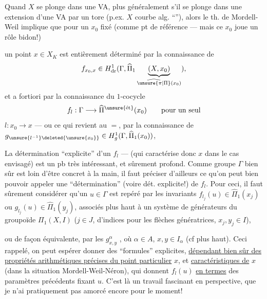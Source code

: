 
Quand $X$ se plonge dans une VA, plus généralement s'il se plonge dans une extension d'une VA par un tore (p.ex. $X$ courbe alg. ``''), alors le th. de Mordell-Weil implique que pour un $x_0$  fixé (comme pt de référence --- mais ce $x_0$  joue un rôle bidon!)

un point $x\in X_K$ est entièrement déterminé par la connaissance de 
\[
f_{x_0,x}\in H^1_{\mathrm{dr}}(\Gamma,\widehat\Pi_1\underbrace{(X,x_0)}_{\widehat{\unsure{\pi|\Pi}}(x_0)}),
\]
et a fortiori par la connaissance du $1$-cocycle
\[
f_l:\Gamma\longrightarrow\widehat\Pi^{\unsure{\text{ét}}}(x_0)\qquad\text{pour un seul}
\]
$l:x_0\longrightarrow x$ --- ou ce qui revient au $=$, par la connaissance de $g_{\unsure{l^{-1}}\deleted{\unsure{x_0}}}\in H^1_g(\Gamma,\widehat\Pi_1(x_0))$, 

\unsure{\P} La détermination ``explicite'' d'un $f_l$ ---  (qui caractérise donc $x$ dans le cas envisagé) est un pb très intéressant, et sûrement profond. Comme   groupe $\Gamma$ bien sûr est loin d'être concret à la main, il faut préciser d'ailleurs ce qu'on peut bien pouvoir appeler une ``détermination'' (voire dét. explicite!) de $f_l$. Pour ceci, il faut sûrement considérer qu'un $u\in\Gamma$ est repéré par les invariants $f_{l_j}(u)\in\widehat\Pi_1(x_j)$ ou $g_{l_j}(u)\in\widehat\Pi_1(y_j)$, associés plus haut à un système  de générateurs  du groupoïde $\Pi_1(X,I)$ ($j\in J$,  d'indices pour les flèches génératrices, $x_j,y_j\in I$),

ou de façon équivalente, par les $g^\alpha_{x,y}$ \inserted{$\in\widehat\pi_\alpha$}, où $\alpha\in A$, $x,y\in I_\alpha$ (cf plus haut). Ceci rappelé, on peut espérer donner des ``formules'' explicites, \uline{dépendant bien sûr des propriétés arithmétiques précises du point particulier} $x$, et \uline{caractéristiques de} $x$ (dans la situation Mordell-Weil-Néron), qui donnent $f_l(u)$ \uline{en termes} des paramètres précédents fixant $u$. C'est là un travail fascinant en perspective, que je n'ai pratiquement pas amorcé encore pour le moment!

